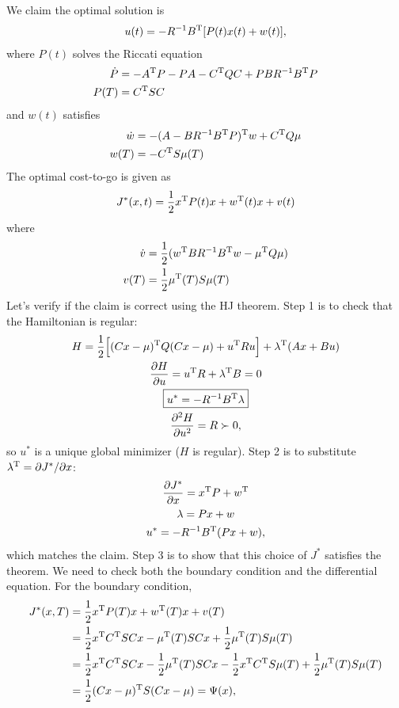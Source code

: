 We claim the optimal solution is
\begin{gather}
  u(t) = -R^{-1}B^\text{T} [P(t)x(t) + w(t)],
\end{gather}
where $P(t)$ solves the Riccati equation
\begin{align}
  \dot P &= -A^\text{T} P - PA - C^\text{T} Q C + PBR^{-1}B^\text{T} P \\
  P(T) &= C^\text{T} SC
\end{align}
and $w(t)$ satisfies
\begin{align}
  \dot w &= -(A-BR^{-1}B^\text{T} P)^\text{T} w + C^\text{T} Q \mu \\
  w(T) &= -C^\text{T} S \mu(T)
\end{align}
The optimal cost-to-go is given as
\begin{gather}
  J^*(x,t) = \frac12 x^\text{T} P(t) x + w^\text{T}(t) x + v(t)
\end{gather}
where
\begin{align}
  \dot v &= \frac12 (w^\text{T} BR^{-1}B^\text{T} w - \mu^\text{T} Q\mu) \\
  v(T) &= \frac12 \mu^\text{T}(T) S \mu(T)
\end{align}
Let's verify if the claim is correct using the HJ theorem. Step 1 is to check that the Hamiltonian is regular:
\begin{gather}
  H = \frac12 \Big[ (Cx-\mu)^\text{T} Q(Cx-\mu) + u^\text{T} Ru \Big] + \lambda^\text{T} (Ax + Bu) \\
  \frac{\partial H}{\partial u} = u^\text{T} R + \lambda^\text{T} B = 0 \\
  \boxed{u^* = -R^{-1}B^\text{T}\lambda} \\
  \frac{\partial ^2 H}{\partial u^2} = R \succ 0,
\end{gather}
so $u^*$ is a unique global minimizer ($H$ is regular). Step 2 is to substitute $\lambda^\text{T}=\partial J^*/\partial x$:
\begin{gather}
  \frac{\partial J^*}{\partial x} = x^\text{T} P + w^\text{T} \\
  \lambda = Px + w \\
  u^* = -R^{-1} B^\text{T} (Px + w),
\end{gather}
which matches the claim. Step 3 is to show that this choice of $J^*$ satisfies the theorem. We need to check both the boundary condition and the differential equation. For the boundary condition,
\begin{align}
  J^*(x,T) &= \frac12 x^\text{T} P(T) x + w^\text{T} (T) x + v(T) \\
           &= \frac12 x^\text{T} C^\text{T} SCx - \mu^\text{T}(T) SCx + \frac12 \mu^\text{T}(T) S\mu(T) \\
           &= \frac12 x^\text{T} C^\text{T} SCx - \frac12 \mu^\text{T}(T) SCx - \frac12 x^\text{T} C^\text{T} S\mu(T) + \frac12 \mu^\text{T}(T) S\mu(T) \\
           &= \frac12 (Cx-\mu)^\text{T} S (Cx-\mu) = \Psi(x),
\end{align}
